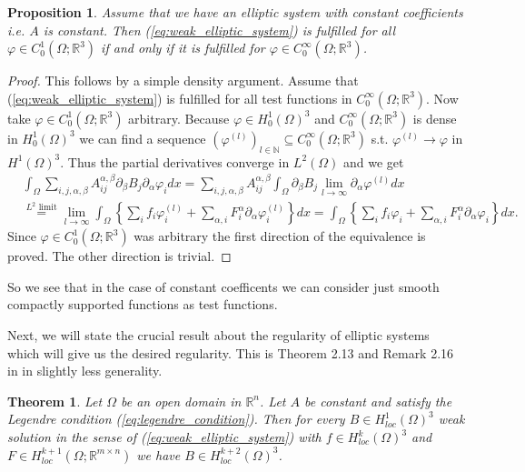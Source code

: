 \documentclass[12pt,a4paper]{article}
\numberwithin{equation}{subsection}
\numberwithin{lemma}{subsection}
\newtheorem{proposition}[lemma]{Proposition}
\newtheorem{theorem}[lemma]{Theorem}
\theoremstyle{definition}
\newcommand{\naturalnum}{\mathbb{N}}
\newcommand{\real}{\mathbb{R}}
\begin{document}
\begin{proposition}
    Assume that we have an elliptic system with constant coefficients i.e. 
    $A$ is constant. Then
    (\ref{eq:weak_elliptic_system}) is fulfilled for all 
    $\varphi \in C^1_0(\Omega;\real^3)$ if and only if it is fulfilled 
    for $\varphi \in C^\infty_0(\Omega;\real^3)$.
\end{proposition}
\begin{proof}
    This follows by a simple density argument. Assume that 
    (\ref{eq:weak_elliptic_system}) is fulfilled for all test functions in 
    $C^\infty_0(\Omega;\real^3)$. Now take $\varphi \in C^1_0(\Omega;\real^3)$
    arbitrary. Because $\varphi \in H_0^1(\Omega)^3$ and 
    $C^\infty_0(\Omega;\real^3)$ is dense in $H_0^1(\Omega)^3$ we can find 
    a sequence $(\varphi^{(l)})_{l \in \naturalnum} \subseteq 
    C^\infty_0(\Omega;\real^3)$ s.t. $\varphi^{(l)} \rightarrow \varphi$
    in $H^1(\Omega)^3$. Thus the partial derivatives converge in $L^2(\Omega)$
    and we get
    \begin{align*}
        &\int_\Omega \sum\limits_{i,j,\alpha,\beta} 
            A_{ij}^{\alpha, \beta} \partial_\beta B_j \partial_\alpha \varphi_i
            dx
        = \sum\limits_{i,j,\alpha,\beta} A_{ij}^{\alpha, \beta}
            \int_\Omega \partial_\beta B_j \lim\limits_{l\rightarrow \infty} 
            \partial_\alpha \varphi^{(l)} dx
        \\ &\stackrel{\text{$L^2$ limit}}{=} 
            \lim\limits_{l\rightarrow \infty} 
            \int_\Omega \left\{ \sum\limits_i f_i \varphi^{(l)}_i + 
            \sum\limits_{\alpha,i} F_i^\alpha \partial_\alpha \varphi^{(l)}_i 
            \right\} dx
        = \int_\Omega \left\{ \sum\limits_i f_i \varphi_i + 
            \sum\limits_{\alpha,i} F_i^\alpha \partial_\alpha \varphi_i 
            \right\} dx.
    \end{align*}
    Since $\varphi \in C_0^1(\Omega;\real^3)$ was arbitrary the first 
    direction of the equivalence is proved. The other direction is trivial.
\end{proof}
So we see that in the case of constant coefficents we can consider 
just smooth compactly supported functions as test functions.

Next, we will state the crucial result about the regularity of elliptic systems
which will give us the desired regularity. This is Theorem 2.13 and Remark 2.16 
in \cite{lectures_on_elliptic_pdes} in slightly less generality.
\begin{theorem}
    Let $\Omega$ be an open domain in $\real^n$. Let $A$ be constant and 
    satisfy the Legendre condition (\ref{eq:legendre_condition}). Then for every 
    $B \in H^1_{loc}(\Omega)^3$ weak solution in the sense of
    (\ref{eq:weak_elliptic_system}) with $f \in H^k_{loc}(\Omega)^3$ and 
    $F \in H^{k+1}_{loc}(\Omega;\real^{m\times n})$ 
    we have $B \in H^{k+2}_{loc}(\Omega)^3$. 
\end{theorem}
\end{document}
